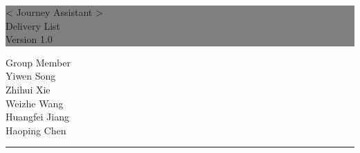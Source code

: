 \documentclass[10pt]{article}
\begin{document}

\begin{titlepage} %
	
	
	\colorbox{grey}{
		\parbox[t]{1.1\textwidth}{ %
			\parbox[t]{1.02\textwidth}{ %
				\raggedleft %
				\fontsize{34pt}{40pt}\selectfont %
				\vspace{0.7cm} %
				
				< Journey Assistant >\\
                Delivery List\\
                Version 1.0\\
				
				\vspace{0.7cm} %
			}
		}
	}
	
	\vfill %
	
	
	\parbox[t]{1\textwidth}{ %
		\raggedleft %
		\large %
		{\Large Group Member}\\[4pt] %
        Yiwen Song\\
        Zhihui Xie\\
        Weizhe Wang\\
        Huangfei Jiang\\
        Haoping Chen\\
		
		\hfill\rule{0.2\linewidth}{1pt}%
    }
    
	
\end{titlepage}
\end{document}
